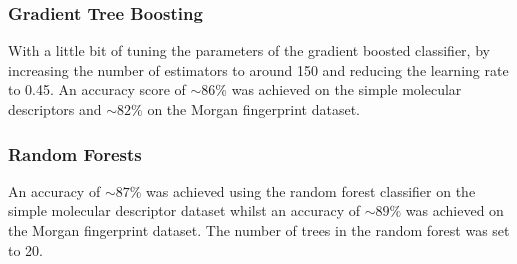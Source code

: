 \documentclass[a4paper,12pt]{report}
\begin{document}
				\subsubsection{Gradient Tree Boosting}
				With a little bit of tuning the parameters of the gradient boosted classifier, by increasing the number of estimators to around 150 and reducing the learning rate to 0.45. An accuracy score of $\sim86\%$ was achieved on the simple molecular descriptors and $\sim82\%$ on the Morgan fingerprint dataset.
			\subsubsection{Random Forests}
				An accuracy of $\sim87\%$ was achieved using the random forest classifier on the simple molecular descriptor dataset whilst an accuracy of $\sim89\%$ was achieved on the Morgan fingerprint dataset. The number of trees in the random forest was set to 20.
\end{document}
